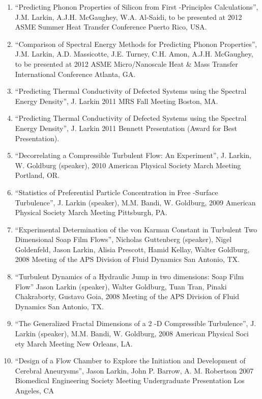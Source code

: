 \documentclass[letterpaper,12pt]{article}
\begin{document}
\begin{enumerate}


\item “Predicting Phonon Properties of Silicon from First -Principles Calculations”, J.M. Larkin, A.J.H.
McGaughey, W.A. Al-Saidi, to be presented at 2012 ASME Summer Heat Transfer Conference Puerto
Rico, USA.

\item “Comparison of Spectral Energy Methods for Predicting Phonon Properties”, J.M. Larkin, A.D.
Massicotte, J.E. Turney, C.H. Amon, A.J.H. McGaughey, to be presented at 2012 ASME
Micro/Nanoscale Heat \& Mass Transfer International Conference Atlanta, GA.

\item “Predicting Thermal Conductivity of Defected Systems using the Spectral Energy Density”, J. Larkin
2011 MRS Fall Meeting Boston, MA.

\item “Predicting Thermal Conductivity of Defected Systems using the Spectral Energy Density”, J. Larkin
2011 Bennett Presentation (Award for Best Presentation).

\item “Decorrelating a Compressible Turbulent Flow: An Experiment”, J. Larkin, W. Goldburg (speaker),
2010 American Physical Society March Meeting Portland, OR.

\item “Statistics of Preferential Particle Concentration in Free -Surface Turbulence”, J. Larkin (speaker),
M.M. Bandi, W. Goldburg, 2009 American Physical Society March Meeting Pittsburgh, PA.

\item “Experimental Determination of the von Karman Constant in Turbulent Two Dimensional Soap Film
Flows”, Nicholas Guttenberg (speaker), Nigel Goldenfeld, Jason Larkin, Alisia Prescott, Hamid Kellay,
Walter Goldburg, 2008 Meeting of the APS Division of Fluid Dynamics San Antonio, TX.

\item “Turbulent Dynamics of a Hydraulic Jump in two dimensions: Soap Film Flow” Jason Larkin (speaker),
Walter Goldburg, Tuan Tran, Pinaki Chakraborty, Gustavo Goia, 2008 Meeting of the APS Division of
Fluid Dynamics San Antonio, TX.

\item “The Generalized Fractal Dimensions of a 2 -D Compressible Turbulence”, J. Larkin (speaker), M.M.
Bandi, W. Goldburg, 2008 American Physical Soci ety March Meeting New Orleans, LA.

\item “Design of a Flow Chamber to Explore the Initiation and Development of Cerebral Aneurysms”,
Jason Larkin, John P. Barrow, A. M. Robertson 2007 Biomedical Engineering Society Meeting
Undergraduate Presentation Los Angeles, CA


\end{enumerate}
\end{document}
